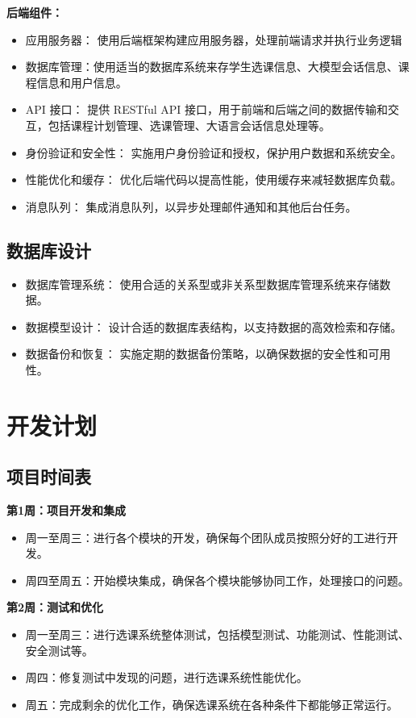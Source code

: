 \documentclass{article}
\begin{document}
\textbf{后端组件：}
\begin{itemize}
	\item 应用服务器： 使用后端框架构建应用服务器，处理前端请求并执行业务逻辑
	\item 数据库管理：使用适当的数据库系统来存学生选课信息、大模型会话信息、课程信息和用户信息。
	\item API 接口： 提供 RESTful API 接口，用于前端和后端之间的数据传输和交互，包括课程计划管理、选课管理、大语言会话信息处理等。
	\item 身份验证和安全性： 实施用户身份验证和授权，保护用户数据和系统安全。
	\item 性能优化和缓存： 优化后端代码以提高性能，使用缓存来减轻数据库负载。
	\item 消息队列： 集成消息队列，以异步处理邮件通知和其他后台任务。
\end{itemize}

\subsection{数据库设计}
\begin{itemize}
	\item 数据库管理系统： 使用合适的关系型或非关系型数据库管理系统来存储数据。
	\item 数据模型设计： 设计合适的数据库表结构，以支持数据的高效检索和存储。
	\item 数据备份和恢复： 实施定期的数据备份策略，以确保数据的安全性和可用性。
\end{itemize}


\section{开发计划}
\subsection{项目时间表}
\textbf{第1周：项目开发和集成}
\begin{itemize}
	\item 周一至周三：进行各个模块的开发，确保每个团队成员按照分好的工进行开发。
	\item 周四至周五：开始模块集成，确保各个模块能够协同工作，处理接口的问题。
\end{itemize}

\textbf{第2周：测试和优化}
\begin{itemize}
  \item 周一至周三：进行选课系统整体测试，包括模型测试、功能测试、性能测试、安全测试等。
  \item 周四：修复测试中发现的问题，进行选课系统性能优化。
  \item 周五：完成剩余的优化工作，确保选课系统在各种条件下都能够正常运行。
\end{itemize}
\end{document}

